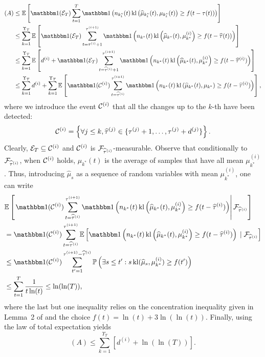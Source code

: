 \begin{align*}
    (A) & \leq \bE\left[\indic(\cE_T) \sum_{t=1}^T \indic\left(n_{k_t^*}(t) \, \kl\left(\widehat{\mu}_{k_t^*}(t), \mu_{k_t^*}(t)\right) \geq f(t - \tau(t))\right)\right] \\
    & \leq \sum_{k=1}^{\Upsilon_T}\bE\left[\indic(\cE_T) \sum_{t=\tau^{(i)}+1}^{\tau^{(i+1)}} \indic\left(n_{k^*}(t) \, \kl\left(\widehat{\mu}_{k^*}(t), \mu_{k^*}^{(i)}\right) \geq f(t - \widehat{\tau}(t))\right)\right] \\
    & \leq \sum_{k=1}^{\Upsilon_T}\bE\left[ d^{(i)} + \indic(\cE_T) \sum_{t=\widehat{\tau}^{(i)}+1}^{\tau^{(i+1)}} \indic\left(n_{k^*}(t) \, \kl\left(\widehat{\mu}_{k^*}(t), \mu_{k^*}^{(i)}\right) \geq f(t - \widehat{\tau}^{(i)})\right)\right] \\
    & \leq \sum_{k=1}^{\Upsilon_T}d^{(i)} + \sum_{k=1}^{\Upsilon_T}\bE\left[\indic(\cC^{(i)}) \sum_{t=\widehat{\tau}^{(i)}}^{\tau^{(i+1)}}\indic\left(n_{k^*}(t) \, \kl\left(\widehat{\mu}_{k^*}(t), \mu_{k^*}\right) \geq f(t - \widehat{\tau}^{(i)})\right)\right],
\end{align*}
%
where we introduce the event $\mathcal{C}^{(i)}$ that all the changes up to the $k$-th have been detected:
%
\begin{equation}\label{def:6:EventCiGlobal}
    \mathcal{C}^{(i)} = \left\{\forall j \leq k, \widehat{\tau}^{(j)} \in \{\tau^{(j)} + 1, \dots, \tau^{(j)} + d^{(j)} \} \right\}.
\end{equation}
%
Clearly, $\mathcal{E}_T \subseteq \mathcal{C}^{(i)}$ and $\mathcal{C}^{(i)}$ is $\mathcal{F}_{\widehat{\tau}^{(i)}}$-measurable. Observe that conditionally to $\mathcal{F}_{\widehat{\tau}^{(i)}}$, when $\mathcal{C}^{(i)}$ holds, $\widehat{\mu}_{k^*}(t)$ is the average of samples that have all mean $\mu_{k^*}^{(i)}$.
%
Thus, introducing $\widehat{\mu}_s$ as a sequence of \iid{} random variables with mean $\mu_{k^*}^{(i)}$, one can write
%
\begin{align*}
    &\bE\left[\left.\indic(\cC^{(i)}) \sum_{t=\widehat{\tau}^{(i)}}^{\tau^{(i+1)}} \indic\left(n_{k^*}(t) \, \kl\left(\widehat{\mu}_{k^*}(t), \mu_{k^*}^{(i)}\right) \geq f(t - \widehat{\tau}^{(i)})\right) \right| \cF_{\widehat{\tau}^{(i)}}\right]\\
    & = \indic(\cC^{(i)}) \sum_{t=\widehat{\tau}^{(i)}}^{\tau^{(i+1)}} \bE\left[\indic\left(n_{k^*}(t) \, \kl\left(\widehat{\mu}_{k^*}(t), \mu_{k^*}^{(i)}\right) \geq f(t - \widehat{\tau}^{(i)})\right) \;|\; \cF_{\widehat{\tau}^{(i)}}\right] \\
    & \leq \indic(\cC^{(i)}) \sum_{t'=1}^{\tau^{(i+1)} - \widehat{\tau}^{(i)}} \bP\left(\exists s \leq t' : s \, \kl(\widehat{\mu}_{s},\mu_{k^*}^{(i)}) \geq f(t')\right) \\
    & \leq \sum_{t=1}^T \frac{1}{t\ln(t)} \leq \ln(\ln(T)),
\end{align*}
%
where the last but one inequality relies on the concentration inequality given in Lemma~2 of \cite{KLUCBJournal} and the choice $f(t) = \ln(t) + 3 \ln(\ln(t))$.
Finally, using the law of total expectation yields
\begin{equation}\label{eq:6:TermAFinalGlobal}
    (A) \leq \sum_{k=1}^{\Upsilon_T}\left[d^{(i)} + \ln(\ln(T))\right].
\end{equation}

